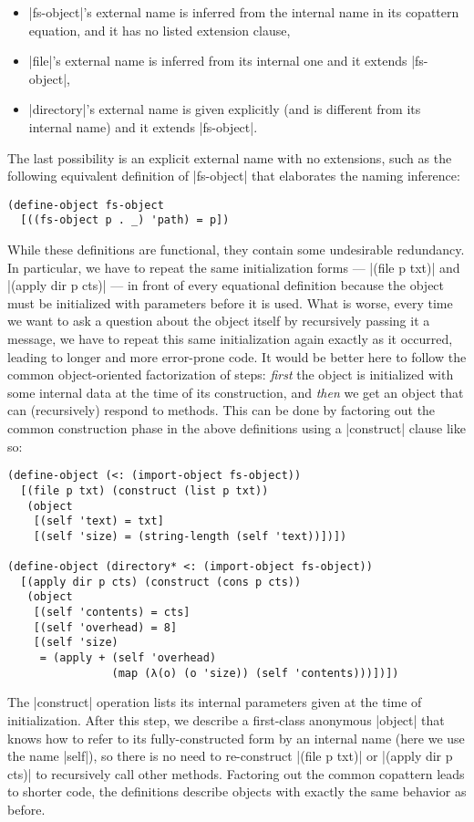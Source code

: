 \begin{itemize}
\item \scm|fs-object|'s external name is inferred from the internal name in its copattern equation, and it has no listed extension clause,
\item \scm|file|'s external name is inferred from its internal one and it extends \scm|fs-object|,
\item \scm|directory|'s external name is given explicitly (and is different from its internal name) and it extends \scm|fs-object|.
\end{itemize}
The last possibility is an explicit external name with no extensions, such as the following equivalent definition of \scm|fs-object| that elaborates the naming inference:
\begin{verbatim}
(define-object fs-object
  [((fs-object p . _) 'path) = p])
\end{verbatim}

While these definitions are functional, they contain some undesirable redundancy.
In particular, we have to repeat the same initialization forms --- \scm|(file p txt)| and \scm|(apply dir p cts)| --- in front of every equational definition because the object must be initialized with parameters before it is used.
What is worse, every time we want to ask a question about the object itself by recursively passing it a message, we have to repeat this same initialization again exactly as it occurred, leading to longer and more error-prone code.
It would be better here to follow the common object-oriented factorization of steps:
\emph{first} the object is initialized with some internal data at the time of its construction, and \emph{then} we get an object that can (recursively) respond to methods.
This can be done by factoring out the common construction phase in the above definitions using a \scm|construct| clause like so:
\begin{verbatim}
(define-object (<: (import-object fs-object))
  [(file p txt) (construct (list p txt))
   (object
    [(self 'text) = txt]
    [(self 'size) = (string-length (self 'text))])])

(define-object (directory* <: (import-object fs-object))
  [(apply dir p cts) (construct (cons p cts))
   (object
    [(self 'contents) = cts]
    [(self 'overhead) = 8]
    [(self 'size)
     = (apply + (self 'overhead)
                (map (λ(o) (o 'size)) (self 'contents)))])])
\end{verbatim}
The \scm|construct| operation lists its internal parameters given at the time of
initialization.
After this step, we describe a first-class anonymous \scm|object| that knows
how to refer to its fully-constructed form by an internal name (here we use the
name \scm|self|), so there is no need to re-construct \scm|(file p txt)| or \scm|(apply dir p cts)| to recursively call other methods.
Factoring out the common copattern leads to shorter code, the definitions describe objects with exactly the same behavior as before.

